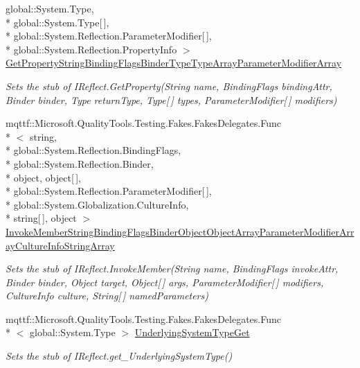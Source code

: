 \begin{DoxyCompactItemize}
global\-::\-System.\-Type, \\*
global\-::\-System.\-Type\mbox{[}$\,$\mbox{]}, \\*
global\-::\-System.\-Reflection.\-Parameter\-Modifier\mbox{[}$\,$\mbox{]}, \\*
global\-::\-System.\-Reflection.\-Property\-Info $>$ \hyperlink{class_system_1_1_reflection_1_1_fakes_1_1_stub_i_reflect_a738083a6a9c0d0fc077732a7270875cb}{Get\-Property\-String\-Binding\-Flags\-Binder\-Type\-Type\-Array\-Parameter\-Modifier\-Array}
\begin{DoxyCompactList}\small\item\em Sets the stub of I\-Reflect.\-Get\-Property(\-String name, Binding\-Flags binding\-Attr, Binder binder, Type return\-Type, Type\mbox{[}$\,$\mbox{]} types, Parameter\-Modifier\mbox{[}$\,$\mbox{]} modifiers)\end{DoxyCompactList}\item 
mqttf\-::\-Microsoft.\-Quality\-Tools.\-Testing.\-Fakes.\-Fakes\-Delegates.\-Func\\*
$<$ string, \\*
global\-::\-System.\-Reflection.\-Binding\-Flags, \\*
global\-::\-System.\-Reflection.\-Binder, \\*
object, object\mbox{[}$\,$\mbox{]}, \\*
global\-::\-System.\-Reflection.\-Parameter\-Modifier\mbox{[}$\,$\mbox{]}, \\*
global\-::\-System.\-Globalization.\-Culture\-Info, \\*
string\mbox{[}$\,$\mbox{]}, object $>$ \hyperlink{class_system_1_1_reflection_1_1_fakes_1_1_stub_i_reflect_a824c377fc6c890dfaebbc577f6ec1438}{Invoke\-Member\-String\-Binding\-Flags\-Binder\-Object\-Object\-Array\-Parameter\-Modifier\-Array\-Culture\-Info\-String\-Array}
\begin{DoxyCompactList}\small\item\em Sets the stub of I\-Reflect.\-Invoke\-Member(\-String name, Binding\-Flags invoke\-Attr, Binder binder, Object target, Object\mbox{[}$\,$\mbox{]} args, Parameter\-Modifier\mbox{[}$\,$\mbox{]} modifiers, Culture\-Info culture, String\mbox{[}$\,$\mbox{]} named\-Parameters)\end{DoxyCompactList}\item 
mqttf\-::\-Microsoft.\-Quality\-Tools.\-Testing.\-Fakes.\-Fakes\-Delegates.\-Func\\*
$<$ global\-::\-System.\-Type $>$ \hyperlink{class_system_1_1_reflection_1_1_fakes_1_1_stub_i_reflect_aebc45abe6f4759bfc0bf640253c81884}{Underlying\-System\-Type\-Get}
\begin{DoxyCompactList}\small\item\em Sets the stub of I\-Reflect.\-get\-\_\-\-Underlying\-System\-Type()\end{DoxyCompactList}\end{DoxyCompactItemize}


